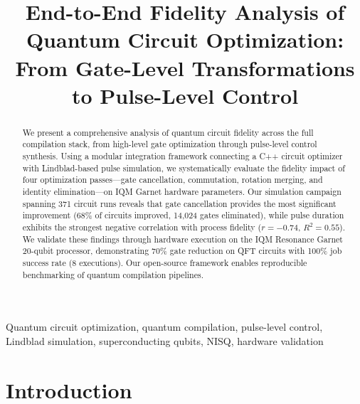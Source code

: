 \documentclass[journal]{IEEEtran}
\begin{document}
\title{End-to-End Fidelity Analysis of Quantum Circuit Optimization: From Gate-Level Transformations to Pulse-Level Control}

\author{
}

\maketitle

\begin{abstract}
We present a comprehensive analysis of quantum circuit fidelity across the full compilation stack, from high-level gate optimization through pulse-level control synthesis. Using a modular integration framework connecting a C++ circuit optimizer with Lindblad-based pulse simulation, we systematically evaluate the fidelity impact of four optimization passes---gate cancellation, commutation, rotation merging, and identity elimination---on IQM Garnet hardware parameters. Our simulation campaign spanning 371 circuit runs reveals that gate cancellation provides the most significant improvement (68\% of circuits improved, 14,024 gates eliminated), while pulse duration exhibits the strongest negative correlation with process fidelity ($r = -0.74$, $R^2 = 0.55$). We validate these findings through hardware execution on the IQM Resonance Garnet 20-qubit processor, demonstrating 70\% gate reduction on QFT circuits with 100\% job success rate (8 executions). Our open-source framework enables reproducible benchmarking of quantum compilation pipelines.
\end{abstract}

\begin{IEEEkeywords}
Quantum circuit optimization, quantum compilation, pulse-level control, Lindblad simulation, superconducting qubits, NISQ, hardware validation
\end{IEEEkeywords}

\section{Introduction}
\end{document}
